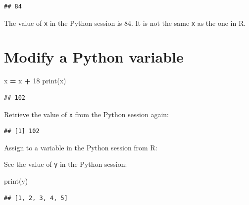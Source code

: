\documentclass[]{book}
\newenvironment{Shaded}{\begin{snugshade}}{\end{snugshade}}
\newcommand{\BuiltInTok}[1]{#1}
\newcommand{\DecValTok}[1]{\textcolor[rgb]{0.00,0.00,0.81}{#1}}
\newcommand{\NormalTok}[1]{#1}
\newcommand{\OperatorTok}[1]{\textcolor[rgb]{0.81,0.36,0.00}{\textbf{#1}}}
\newcommand{\StringTok}[1]{\textcolor[rgb]{0.31,0.60,0.02}{#1}}
\begin{document}
\begin{verbatim}
## 84
\end{verbatim}

The value of \texttt{x} in the Python session is 84.
It is not the same \texttt{x} as the one in R.

\hypertarget{modify-a-python-variable}{%
\section{Modify a Python variable}\label{modify-a-python-variable}}

\begin{Shaded}
\begin{Highlighting}[]
\NormalTok{x }\OperatorTok{=}\NormalTok{ x }\OperatorTok{+} \DecValTok{18} 
\BuiltInTok{print}\NormalTok{(x)}
\end{Highlighting}
\end{Shaded}

\begin{verbatim}
## 102
\end{verbatim}

Retrieve the value of \texttt{x} from the Python session again:

\begin{Shaded}
\end{Shaded}

\begin{verbatim}
## [1] 102
\end{verbatim}

Assign to a variable in the Python session from R:

\begin{Shaded}
\end{Shaded}

See the value of \texttt{y} in the Python session:

\begin{Shaded}
\begin{Highlighting}[]
\BuiltInTok{print}\NormalTok{(y)}
\end{Highlighting}
\end{Shaded}

\begin{verbatim}
## [1, 2, 3, 4, 5]
\end{verbatim}
\end{document}
